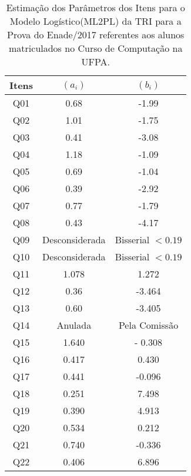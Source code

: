 \documentclass[12pt]{article}
\begin{document}
\begin{table}[htp]
	\centering
	\caption{Estimação dos Parâmetros dos Itens para o Modelo Logístico(ML2PL) da TRI para a Prova do Enade/2017 referentes aos alunos matriculados no Curso de Computação na UFPA.}
\begin{tabular}{c|c|c}
\hline\hline 
  Itens       &  $(a_{i})$       & $(b_{i})$  \\
\hline\hline
  Q01         &  0.68            &  -1.99                  \\
  Q02         &   1.01           &  -1.75                 \\
  Q03         &   0.41           &  -3.08                 \\
  Q04         &   1.18           &  -1.09                 \\
  Q05         &   0.69           &  -1.04                 \\
  Q06         &   0.39           &  -2.92                  \\
  Q07         &   0.77           &  -1.79                  \\
  Q08         &   0.43           &  -4.17                 \\
  Q09         &   Desconsiderada & Bisserial $< 0.19$   \\
  Q10         &   Desconsiderada & Bisserial $< 0.19$   \\
  Q11         &   1.078          &  1.272                  \\
  Q12         &   0.36           &  -3.464                  \\
  Q13         &   0.60           &  -3.405                  \\
  Q14         &   Anulada        &  Pela Comissão     \\
  Q15         &   1.640          &   - 0.308                 \\
  Q16         &   0.417          &   0.430                 \\
  Q17         &   0.441          &   -0.096                \\
  Q18         &   0.251          &   7.498                 \\
  Q19         &   0.390          &   4.913                 \\
  Q20         &   0.534          &    0.212                \\
  Q21         &   0.740            &  -0.336                  \\
  Q22         &   0.406            &  6.896                  \\

\end{tabular}
\end{table}
\end{document}
